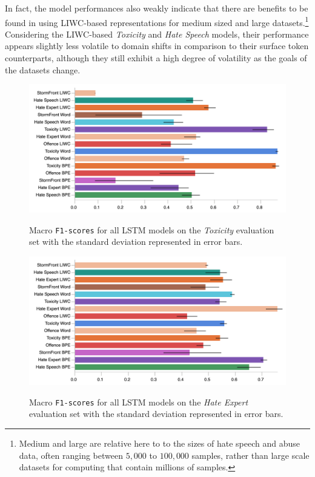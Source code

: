 In fact, the model performances also weakly indicate that there are benefits to be found in using LIWC-based representations for medium sized and large datasets.\footnote{Medium and large are relative here to to the sizes of hate speech and abuse data, often ranging between $5,000$ to $100,000$ samples, rather than large scale datasets for computing that contain millions of samples.}
Considering the LIWC-based \textit{Toxicity} and \textit{Hate Speech} models, their performance appears slightly less volatile to domain shifts in comparison to their surface token counterparts, although they still exhibit a high degree of volatility as the goals of the datasets change.

\begin{figure}
\begin{minipage}{\textwidth}
    \centering
    \includegraphics[width=\textwidth]{all_lstm_wulczyn_test.pdf}
    \caption{Macro \texttt{F1-scores} for all LSTM models on the \textit{Toxicity} evaluation set with the standard deviation represented in error bars.}
    \label{fig:wulczyn_lstm_test}
  \vfill
    \includegraphics[width=\textwidth]{all_lstm_waseem_test.pdf}
    \caption{Macro \texttt{F1-scores} for all LSTM models on the \textit{Hate Expert} evaluation set with the standard deviation represented in error bars.}
    \label{fig:waseem_lstm_test}
\end{minipage}
\end{figure}


